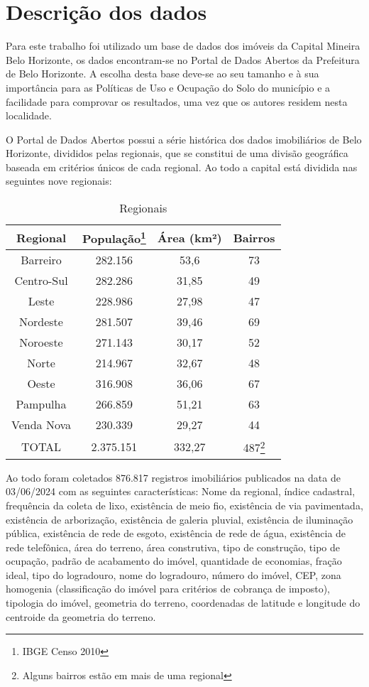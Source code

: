 \documentclass[12pt]{article}
\begin{document}
\section{Descrição dos dados}
Para este trabalho foi utilizado um base de dados dos imóveis da Capital Mineira Belo Horizonte, os dados encontram-se no Portal de Dados Abertos da Prefeitura de Belo Horizonte. A escolha desta base deve-se ao seu tamanho e à sua importância para as Políticas de Uso e Ocupação do Solo do município e a facilidade para comprovar os resultados, uma vez que os autores residem nesta localidade. 

O Portal de Dados Abertos possui a série histórica dos dados imobiliários de Belo Horizonte, divididos pelas regionais, que se constitui de uma divisão geográfica baseada em critérios únicos de cada regional. Ao todo a capital está dividida nas seguintes nove regionais:

\begin{table}
    \centering
    \begin{tabular}{cccc}
Regional & População\footnote{IBGE Censo 2010} & Área (km²) & Bairros\\
\hline
Barreiro & 282.156 & 53,6 & 73\\
Centro-Sul & 282.286 & 31,85 & 49\\
Leste & 228.986 & 27,98 & 47\\
Nordeste & 281.507 & 39,46 & 69\\
Noroeste & 271.143 & 30,17 & 52\\
Norte & 214.967 & 32,67 & 48\\
Oeste & 316.908 & 36,06 & 67\\
Pampulha & 266.859 & 51,21 & 63\\
Venda Nova & 230.339 & 29,27 & 44\\
\hline
\hline
TOTAL & 2.375.151 & 332,27 & 487\footnote{Alguns bairros estão em mais de uma regional}\\

    \end{tabular}
    \caption{Regionais}
    \label{tab:regionais}
\end{table}
Ao todo foram coletados 876.817 registros imobiliários publicados na data de  03/06/2024 com as seguintes características: Nome da regional, índice cadastral, frequência da coleta de lixo, existência de meio fio, existência de via pavimentada, existência de arborização, existência de galeria pluvial, existência de iluminação pública, existência de rede de esgoto, existência de rede de água, existência de rede telefônica, área do terreno,  área construtiva, tipo de construção, tipo de ocupação, padrão de acabamento do imóvel, quantidade de economias, fração ideal, tipo do logradouro, nome do logradouro, número do imóvel, CEP, zona homogenia (classificação do imóvel para critérios de cobrança de imposto), tipologia do imóvel, geometria do terreno, coordenadas de latitude e longitude do centroide da geometria do terreno.
\end{document}
